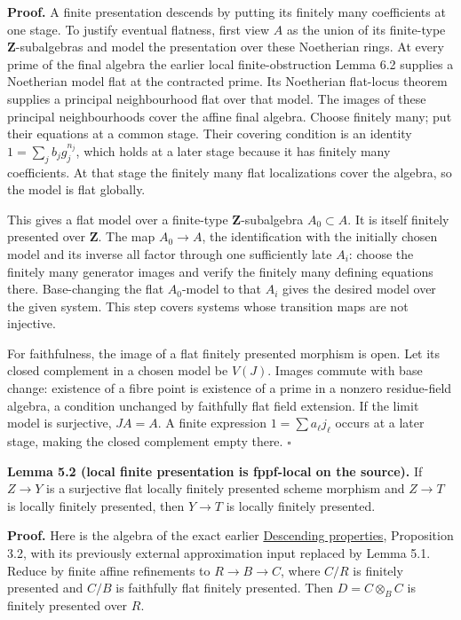 \documentclass[11pt,a4paper,openany]{report}
\begin{document}
\textbf{Proof.} A finite presentation descends by putting its finitely many coefficients at one stage. To justify eventual flatness, first view \(A\) as the union of its finite-type \(\mathbf Z\)-subalgebras and model the presentation over these Noetherian rings. At every prime of the final algebra the earlier local finite-obstruction Lemma 6.2 supplies a Noetherian model flat at the contracted prime. Its Noetherian flat-locus theorem supplies a principal neighbourhood flat over that model. The images of these principal neighbourhoods cover the affine final algebra. Choose finitely many; put their equations at a common stage. Their covering condition is an identity \(1=\sum_j b_jg_j^{n_j}\), which holds at a later stage because it has finitely many coefficients. At that stage the finitely many flat localizations cover the algebra, so the model is flat globally.

This gives a flat model over a finite-type \(\mathbf Z\)-subalgebra \(A_0\subset A\). It is itself finitely presented over \(\mathbf Z\). The map \(A_0\to A\), the identification with the initially chosen model and its inverse all factor through one sufficiently late \(A_i\): choose the finitely many generator images and verify the finitely many defining equations there. Base-changing the flat \(A_0\)-model to that \(A_i\) gives the desired model over the given system. This step covers systems whose transition maps are not injective.

For faithfulness, the image of a flat finitely presented morphism is open. Let its closed complement in a chosen model be \(V(J)\). Images commute with base change: existence of a fibre point is existence of a prime in a nonzero residue-field algebra, a condition unchanged by faithfully flat field extension. If the limit model is surjective, \(JA=A\). A finite expression \(1=\sum a_\ell j_\ell\) occurs at a later stage, making the closed complement empty there. \(\square\)

\textbf{Lemma 5.2 (local finite presentation is fppf-local on the source).} If \(Z\to Y\) is a surjective flat locally finitely presented scheme morphism and \(Z\to T\) is locally finitely presented, then \(Y\to T\) is locally finitely presented.

\textbf{Proof.} Here is the algebra of the exact earlier \href{https://github.com/KokunoYumeto/open-math-courses/blob/d02d0a3669f42579db037cd44de1d113fdd770a1/docs/courses/AG-DFG/src/descending-properties.md}{Descending properties}, Proposition 3.2, with its previously external approximation input replaced by Lemma 5.1. Reduce by finite affine refinements to \(R\to B\to C\), where \(C/R\) is finitely presented and \(C/B\) is faithfully flat finitely presented. Then \(D=C\otimes_B C\) is finitely presented over \(R\).
\end{document}

